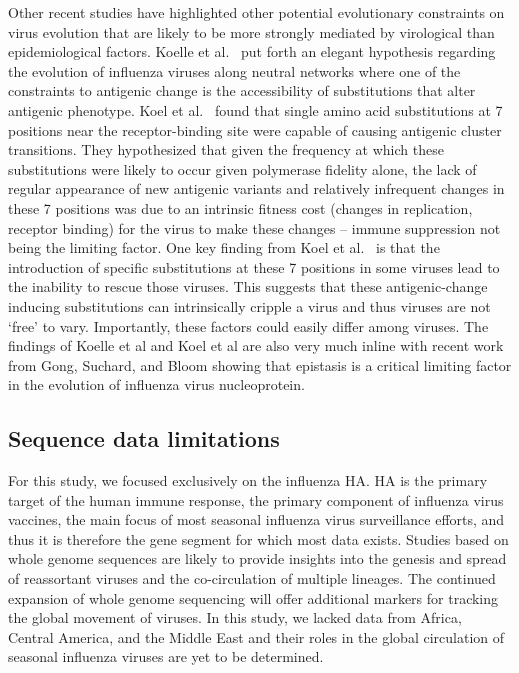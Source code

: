 \documentclass[11pt,oneside,letterpaper]{article}
\begin{document}
Other recent studies have highlighted other potential evolutionary constraints on virus evolution that are likely to be more strongly mediated by virological than epidemiological factors.
Koelle et al.\ \cite{Koelle06} put forth an elegant hypothesis regarding the evolution of influenza viruses along neutral networks where one of the constraints to antigenic change is the accessibility of substitutions that alter antigenic phenotype.
Koel et al.\ \cite{Koel13} found that single amino acid substitutions at 7 positions near the receptor-binding site were capable of causing antigenic cluster transitions.
They hypothesized that given the frequency at which these substitutions were likely to occur given polymerase fidelity alone, the lack of regular appearance of new antigenic variants and relatively infrequent changes in these 7 positions was due to an intrinsic fitness cost (changes in replication, receptor binding) for the virus to make these changes -- immune suppression not being the limiting factor.
One key finding from Koel et al.\ \cite{Koel13} is that the introduction of specific substitutions at these 7 positions in some viruses lead to the inability to rescue those viruses.
This suggests that these antigenic-change inducing substitutions can intrinsically cripple a virus and thus viruses are not `free' to vary.
Importantly, these factors could easily differ among viruses.
The findings of Koelle et al and Koel et al are also very much inline with recent work from Gong, Suchard, and Bloom \cite{Gong13} showing that epistasis is a critical limiting factor in the evolution of influenza virus nucleoprotein.



\subsection*{Sequence data limitations}

For this study, we focused exclusively on the influenza HA. HA is the primary target of the human immune response, the primary component of influenza virus vaccines, the main focus of most seasonal influenza virus surveillance efforts, and thus it is therefore the gene segment for which most data exists.
Studies based on whole genome sequences are likely to provide insights into the genesis and spread of reassortant viruses and the co-circulation of multiple lineages.
The continued expansion of whole genome sequencing will offer additional markers for tracking the global movement of viruses.
In this study, we lacked data from Africa, Central America, and the Middle East and their roles in the global circulation of seasonal influenza viruses are yet to be determined.



\end{document}

